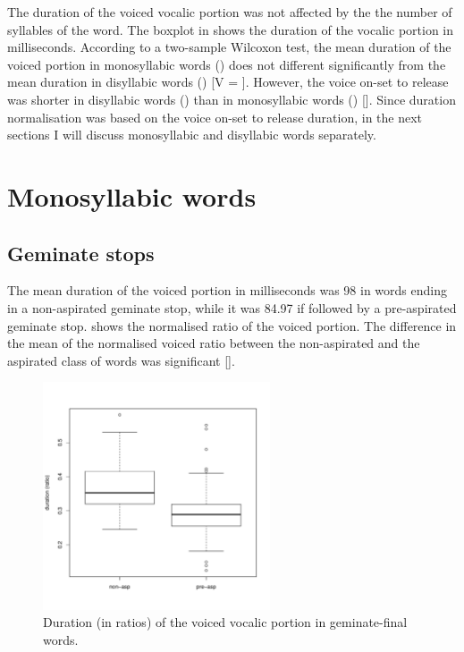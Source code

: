 \documentclass[11pt,a4paper,openany]{memoir}\usepackage[]{graphicx}\usepackage[]{color}
\newenvironment{knitrout}{}{} %
\begin{document}
The duration of the voiced vocalic portion was not affected by the the number of syllables of the word.
The boxplot in  shows the duration of the vocalic portion in milliseconds.
According to a two-sample Wilcoxon test, the mean duration of the voiced portion in monosyllabic words () does not different significantly from the mean duration in disyllabic words () [V = ].
However, the voice on-set to release was shorter in disyllabic words () than in monosyllabic words () [].
Since duration normalisation was based on the voice on-set to release duration, in the next sections I will discuss monosyllabic and disyllabic words separately.

\section{Monosyllabic words}

\subsection{Geminate stops}



The mean duration of the voiced portion in milliseconds was 98 in words ending in a non-aspirated geminate stop, while it was 84.97 if followed by a pre-aspirated geminate stop.
 shows the normalised ratio of the voiced portion.
The difference in the mean of the normalised voiced ratio between the non-aspirated and the aspirated class of words was significant [].

\begin{figure}
\centering
\begin{knitrout}
\color{fgcolor}
\includegraphics[width=0.6\textwidth]{img/mono-stop-box-1} 

\end{knitrout}
\caption{Duration (in ratios) of the voiced vocalic portion in geminate-final words.}
\label{f:monostop}
\end{figure}
\end{document}
